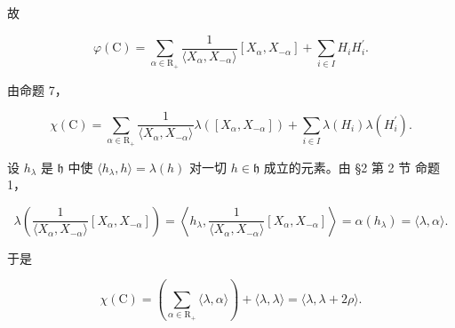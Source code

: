 故

\[
\varphi (\mathrm{C}) = \sum_ {\alpha \in \mathrm{R} _ {+}} \frac {1}{\langle X _ {\alpha} , X _ {- \alpha} \rangle} [ X _ {\alpha}, X _ {- \alpha} ] + \sum_ {i \in I} H _ {i} H _ {i} ^ {\prime}.
\]

由命题 7，

\[
\chi (\mathrm{C}) = \sum_ {\alpha \in \mathrm{R} _ {+}} \frac {1}{\langle X _ {\alpha} , X _ {- \alpha} \rangle} \lambda ([ X _ {\alpha}, X _ {- \alpha} ]) + \sum_ {i \in I} \lambda (H _ {i}) \lambda (H _ {i} ^ {\prime}).
\]

设 \(h_{\lambda}\) 是 \(\mathfrak{h}\) 中使 \(\langle h_{\lambda}, h \rangle = \lambda(h)\) 对一切 \(h \in \mathfrak{h}\) 成立的元素。由 §2 第 2 节 命题 1，

\[
\lambda \left(\frac {1}{\langle X _ {\alpha} , X _ {- \alpha} \rangle} [ X _ {\alpha}, X _ {- \alpha} ]\right) = \left\langle h _ {\lambda}, \frac {1}{\langle X _ {\alpha} , X _ {- \alpha} \rangle} [ X _ {\alpha}, X _ {- \alpha} ] \right\rangle = \alpha (h _ {\lambda}) = \langle \lambda , \alpha \rangle .
\]

于是

\[
\chi (\mathrm{C}) = \left(\sum_ {\alpha \in \mathrm{R} _ {+}} \langle \lambda , \alpha \rangle\right) + \langle \lambda , \lambda \rangle = \langle \lambda , \lambda + 2 \rho \rangle .
\]

